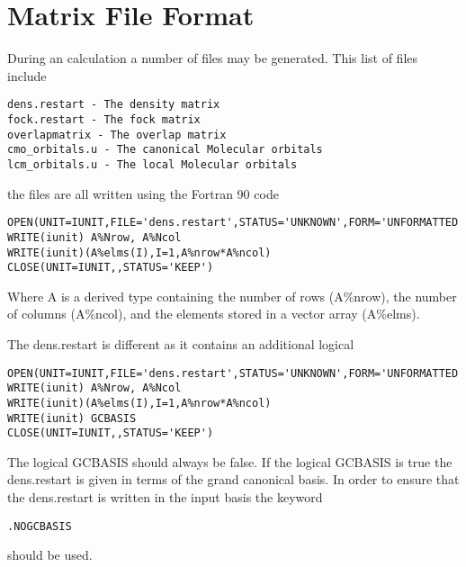 \section{Matrix File Format}

During an {\lsdalton} calculation a number of files may be generated. This list of files include 

\begin{verbatim}
dens.restart - The density matrix
fock.restart - The fock matrix
overlapmatrix - The overlap matrix
cmo_orbitals.u - The canonical Molecular orbitals 
lcm_orbitals.u - The local Molecular orbitals 
\end{verbatim}

the files are all written using the Fortran 90 code

\begin{lstlisting}
OPEN(UNIT=IUNIT,FILE='dens.restart',STATUS='UNKNOWN',FORM='UNFORMATTED',IOSTAT=IOS)
WRITE(iunit) A%Nrow, A%Ncol
WRITE(iunit)(A%elms(I),I=1,A%nrow*A%ncol)
CLOSE(UNIT=IUNIT,,STATUS='KEEP')
\end{lstlisting}

Where A is a derived type containing the number of rows (A$\%$nrow), the number of columns (A$\%$ncol), and the elements stored in a vector array (A$\%$elms). 

The dens.restart is different as it contains an additional logical 
\begin{lstlisting}
OPEN(UNIT=IUNIT,FILE='dens.restart',STATUS='UNKNOWN',FORM='UNFORMATTED',IOSTAT=IOS)
WRITE(iunit) A%Nrow, A%Ncol
WRITE(iunit)(A%elms(I),I=1,A%nrow*A%ncol)
WRITE(iunit) GCBASIS
CLOSE(UNIT=IUNIT,,STATUS='KEEP')
\end{lstlisting}
The logical GCBASIS should always be false. If the logical GCBASIS is true 
the dens.restart is given in terms of the grand canonical basis. 
In order to ensure that the dens.restart is written in the input basis the keyword
\begin{verbatim}
.NOGCBASIS
\end{verbatim}
should be used. 




